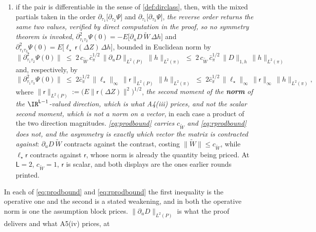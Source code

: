\begin{lemma}
\begin{enumerate}
$\|D\mathsf r\|\le\|D\|\,\|\mathsf r\|$ with the Frobenius norm on $D$;
\item[(iv)] if the pair is differentiable in the sense of \cref{def:dirclass}, then, with the mixed
partials taken in the order $\partial_{\tau_1}\big[\partial_{\tau_2}\Psi\big]$ and
$\partial_{\tau_1}\big[\partial_{\tau_3}\Psi\big]$, \emph{the reverse order returns the same two
values, verified by direct computation in the proof, so no symmetry theorem is invoked}, 
$\partial^{2}_{\tau_1\tau_2}\Psi(0)=-E\big[\partial_uD\,\widetilde W\,\Delta h\big]$ and
$\partial^{2}_{\tau_1\tau_3}\Psi(0)=E\big[\ell_\star\,\mathsf r(\Delta Z)\,\Delta h\big]$, bounded in
Euclidean norm by
\begin{equation}\label{eq:prodbound}
\big\|\partial^{2}_{\tau_1\tau_2}\Psi(0)\big\|
\;\le\;2\,c_{\widetilde W}\,\bar c_\pi^{1/2}\,\big\|\partial_uD\big\|_{L^{2}(P)}\,\|h\|_{L^{2}(\pi)}
\;\le\;2\,c_{\widetilde W}\,\bar c_\pi^{1/2}\,\|D\|_{1,h}\,\|h\|_{L^{2}(\pi)}
\end{equation}
and, respectively, by
\begin{equation}\label{eq:rprodbound}
\big\|\partial^{2}_{\tau_1\tau_3}\Psi(0)\big\|
\;\le\;2\bar c_\pi^{1/2}\,\big\|\ell_\star\big\|_\infty\,\big\|\mathsf r\big\|_{L^{2}(P)}\,\|h\|_{L^{2}(\pi)}
\;\le\;2\bar c_\pi^{1/2}\,\big\|\ell_\star\big\|_\infty\,\big\|\mathsf r\big\|_\infty\,\|h\|_{L^{2}(\pi)},
\end{equation}
where $\|\mathsf r\|_{L^{2}(P)}:=\big(E\big\|\mathsf r(\Delta Z)\big\|^{2}\big)^{1/2}$, \emph{the
second moment of the \textbf{norm} of the $\IR^{\mathsf L-1}$-valued direction, which is what A4(iii)
prices, and not the scalar second moment, which is not a norm on a vector}, in each case a product
of the two direction magnitudes.
\emph{\eqref{eq:prodbound} carries $c_{\widetilde W}$ and \eqref{eq:rprodbound} does not, and
the asymmetry is exactly which vector the matrix is contracted against}: $\partial_uD\,\widetilde W$
contracts against the contrast, costing $\|\widetilde W\|\le c_{\widetilde W}$, while
$\ell_\star\mathsf r$ contracts against $\mathsf r$, whose norm is already the quantity being priced.
At $\mathsf L=2$, $c_{\widetilde W}=1$, $\mathsf r$ is scalar, and both displays are the
ones earlier rounds printed.
\end{enumerate}
In each of \eqref{eq:prodbound} and \eqref{eq:rprodbound} the first inequality is the operative one
and the second is a stated weakening, and in both the operative norm is one the assumption block
prices. $\|\partial_uD\|_{L^{2}(P)}$ is what the proof delivers and what A5(iv) prices, at

\end{lemma}
